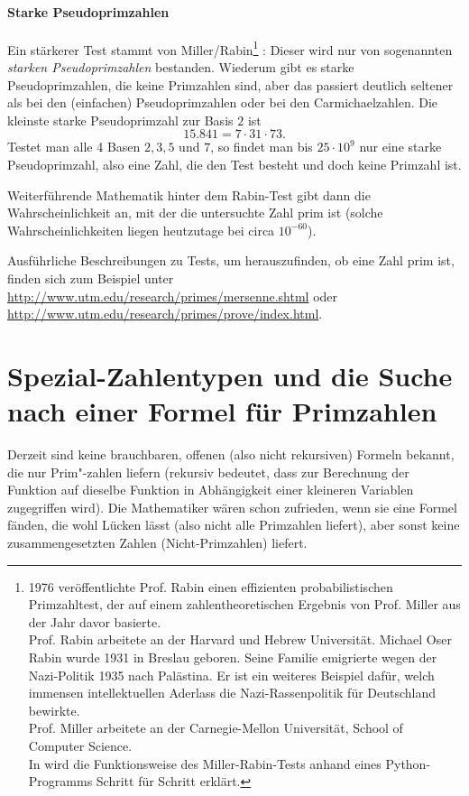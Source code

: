 \begin{refsegment}
\paragraph*{Starke Pseudoprimzahlen}%
\hypertarget{HT-Strongpseudoprimenumber01}{}\label{L-Strongpseudoprimenumber01}%

Ein stärkerer Test stammt von
Miller/Rabin\footnote{
  1976 veröffentlichte Prof. Rabin einen effizienten probabilistischen
  Primzahltest, der auf einem zahlentheoretischen Ergebnis von Prof. Miller aus
  der Jahr davor basierte.\\
  Prof. Rabin arbeitete an der Harvard und Hebrew Universität.
  Michael Oser Rabin wurde 1931 in Breslau geboren. Seine Familie
  emigrierte wegen der Nazi-Politik 1935 nach Palästina. Er ist ein weiteres Beispiel
  dafür, welch immensen intellektuellen Aderlass die Nazi-Rassenpolitik für Deutschland
  bewirkte.\\
  Prof. Miller arbeitete an der Carnegie-Mellon Universität, School of Computer
  Science.\\
  In \cite{Witten2010b} wird die Funktionsweise des Miller-Rabin-Tests anhand eines
  Python-Programms Schritt für Schritt erklärt.
}%
: Dieser wird nur von sogenannten {\em starken Pseudoprimzahlen} bestanden.
Wiederum gibt es starke Pseudoprimzahlen, die keine Primzahlen sind, aber
das passiert deutlich seltener als bei den (einfachen) Pseudoprimzahlen oder
bei den Carmichaelzahlen. Die kleinste starke Pseudoprimzahl zur Basis $2$ ist
$$ 15.841 = 7 \cdot 31 \cdot 73. $$
Testet man alle 4 Basen $2, 3, 5$ und $7$, so findet man bis $25 \cdot 10^9$
nur eine starke Pseudoprimzahl, also eine Zahl, die den Test besteht und doch keine Primzahl ist.

Weiterführende Mathematik hinter dem Rabin-Test gibt dann die Wahrscheinlichkeit an, mit der die
untersuchte Zahl prim ist (solche Wahrscheinlichkeiten liegen heutzutage bei circa  $10^{-60}$).

Ausführliche Beschreibungen zu Tests, um herauszufinden, ob eine Zahl
prim ist, finden sich zum Beispiel unter
 \url{http://www.utm.edu/research/primes/mersenne.shtml} oder
 \url{http://www.utm.edu/research/primes/prove/index.html}.



\section{Spezial-Zahlentypen und die Suche nach einer Formel für Primzahlen}
\label{spezialzahlentypen}
Derzeit sind keine brauchbaren, offenen (also nicht rekursiven) Formeln bekannt,
die nur Prim"-zahlen liefern (rekursiv bedeutet, dass zur Berechnung der Funktion
auf dieselbe Funktion in Abhängigkeit einer kleineren Variablen zugegriffen wird).
Die Mathematiker wären schon zufrieden, wenn sie eine Formel fänden, die wohl
Lücken lässt (also nicht alle Primzahlen liefert), aber sonst keine
zusammengesetzten Zahlen (Nicht-Primzahlen) liefert.


\end{refsegment}
